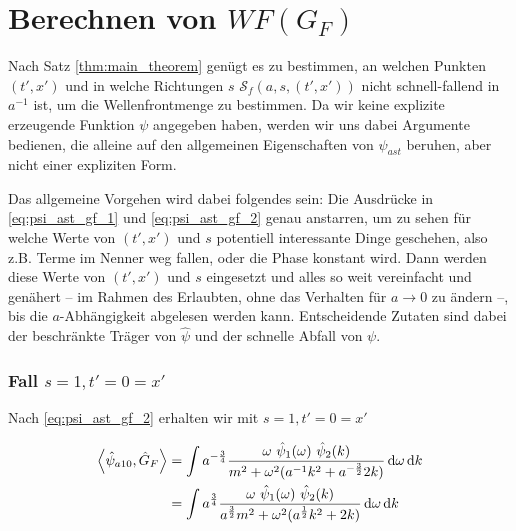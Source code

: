 \documentclass{scrartcl}
\begin{document}
\section{Berechnen von $WF(G_F)$} %
\label{sec:berechnen_von_}

Nach Satz \eqref{thm:main_theorem} genügt es zu bestimmen, an welchen Punkten
$(t', x')$ und in welche Richtungen $s$ $\mathcal{S}_f(a,s,(t',x'))$ nicht schnell-fallend
in $a^{-1}$ ist, um die Wellenfrontmenge zu bestimmen. Da wir keine explizite
erzeugende Funktion $\psi$ angegeben haben, werden wir uns dabei Argumente bedienen,
die alleine auf den allgemeinen Eigenschaften von $\psi_{ast}$ beruhen, aber nicht
einer expliziten Form.

Das allgemeine Vorgehen wird dabei folgendes sein: Die Ausdrücke in \eqref{eq:psi_ast_gf_1}
und \eqref{eq:psi_ast_gf_2} genau anstarren, um zu sehen für welche Werte von
$(t',x')$ und $s$ potentiell interessante Dinge geschehen, also z.B. Terme im Nenner
weg fallen, oder die Phase konstant wird. Dann werden diese Werte von $(t',x')$ und
$s$ eingesetzt und alles so weit vereinfacht und genähert -- im Rahmen des Erlaubten, ohne
das Verhalten für $a \rightarrow 0$ zu ändern --, bis die $a$-Abhängigkeit abgelesen
werden kann. Entscheidende Zutaten sind dabei der beschränkte Träger von $\hat \psi$
und der schnelle Abfall von $\psi$.


\subsubsection*{Fall $s=1, t' = 0 = x'$}
Nach \eqref{eq:psi_ast_gf_2} erhalten wir mit $s=1, t' = 0 = x'$

\begin{align*}
    \left< \hat\psi_{a10}, \hat G_F \right>
    &=
    \int a^{-\frac{3}{4}} \frac{
        \omega ~\hat \psi_1(\omega) ~\hat \psi_2(k)
    }
    {
        m^2+\omega^2 (a^{-1}k^2 + a^{-\frac{3}{2}}2 k )
    }
    \mathop{}\!\mathrm{d} \omega \mathop{}\!\mathrm{d} k \\
    &=
    \int a^{\frac{3}{4}} \frac{
        \omega ~\hat \psi_1(\omega) ~\hat \psi_2(k)
    }
    {
        a^\frac{3}{2} m^2+\omega^2 (a^\frac{1}{2}k^2 + 2 k )
    }
    \mathop{}\!\mathrm{d} \omega \mathop{}\!\mathrm{d} k
\end{align*}
\end{document}

